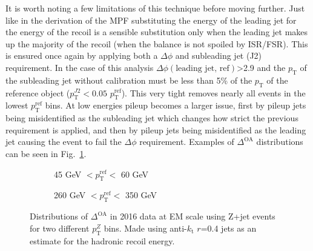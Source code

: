 It is worth noting a few limitations of this technique before moving further.  
Just like in the derivation of the MPF substituting the energy of the leading jet for the energy of the recoil is a sensible substitution only when the leading jet makes up the majority of the recoil (when the balance is not spoiled by ISR/FSR).  
This is ensured once again by applying both a $\Delta\phi$ and subleading jet (J2) requirement.  
In the case of this analysis $\Delta\phi\left(\text{leading jet, ref}\right)$>2.9 and the $p_{\mathrm T}$ of the subleading jet without calibration must be less than 5\% of the $p_{\mathrm T}$ of the reference object ($p_{\mathrm T}^{J2}<0.05$ $p_{\mathrm T}^{\mathrm{ref}}$).  
This very tight removes nearly all events in the lowest $p_{\mathrm T}^{\mathrm {ref}}$ bins.  
At low energies pileup becomes a larger issue, first by pileup jets being misidentified as the subleading jet which changes how strict the previous requirement is applied, and then by pileup jets being misidentified as the leading jet causing the event to fail the $\Delta\phi$ requirement.  
Examples of $\Delta^{\mathrm {OA}}$ distributions can be seen in Fig.~\ref{Fig:OADistExample}.  

\begin{figure}[!ht]
  \centering
  \begin{subfigure}{.5\textwidth}
    \centering
    \caption{45 GeV $< p_{\mathrm{T}}^{\mathrm{ref}} < $ 60 GeV}
  \end{subfigure}%
  \begin{subfigure}{.5\textwidth}  \centering
    \caption{260 GeV $< p_{\mathrm{T}}^{\mathrm{ref}} < $ 350 GeV}
  \end{subfigure}
 \caption[Example $\Delta^{\mathrm{OA}}$ distributions]
 {\small Distributions of $\Delta^{\mathrm{OA}}$ in 2016 data at EM scale using Z+jet events for two different $p_{\mathrm T}^Z$ bins.  Made using anti-$k_{\mathrm t}$ $r$=0.4 jets as an estimate for the hadronic recoil energy.  }
 \label{Fig:OADistExample}
\end{figure}



